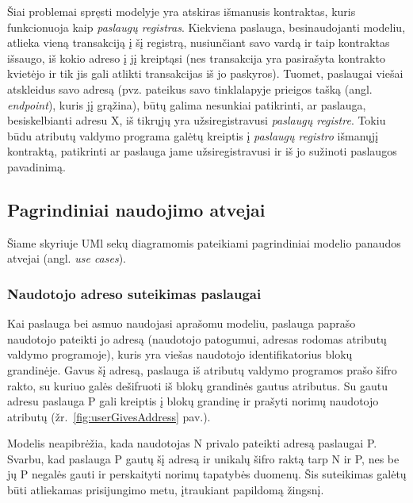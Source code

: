 Šiai problemai spręsti modelyje yra atskiras išmanusis kontraktas, kuris funkcionuoja kaip \textit{paslaugų registras}. Kiekviena
paslauga, besinaudojanti modeliu, atlieka vieną transakciją į šį registrą, nusiunčiant savo vardą ir taip kontraktas išsaugo, iš kokio adreso į jį kreiptąsi (nes
transakcija yra pasirašyta kontrakto kvietėjo ir tik jis gali atlikti transakcijas iš jo paskyros). Tuomet, paslaugai viešai
atskleidus savo adresą (pvz. pateikus savo tinklalapyje prieigos tašką (angl. \textit{endpoint}), kuris jį grąžina), būtų galima
nesunkiai patikrinti, ar paslauga, besiskelbianti adresu X, iš tikrųjų yra užsiregistravusi \textit{paslaugų registre}. Tokiu būdu
atributų valdymo programa galėtų kreiptis į \textit{paslaugų registro} išmanųjį kontraktą, patikrinti ar paslauga jame užsiregistravusi ir iš jo sužinoti paslaugos
pavadinimą. 

\subsection{Pagrindiniai naudojimo atvejai}

Šiame skyriuje UMl sekų diagramomis pateikiami pagrindiniai modelio panaudos atvejai (angl. \textit{use cases}).

\subsubsection{Naudotojo adreso suteikimas paslaugai}

Kai paslauga bei asmuo naudojasi aprašomu modeliu, paslauga paprašo naudotojo pateikti jo adresą (naudotojo patogumui, adresas rodomas
atributų valdymo programoje),
kuris yra viešas naudotojo identifikatorius blokų grandinėje.
Gavus šį adresą, paslauga iš atributų valdymo programos prašo šifro rakto, su kuriuo galės dešifruoti iš blokų grandinės gautus atributus.
Su gautu adresu paslauga P gali kreiptis į blokų grandinę ir prašyti norimų naudotojo atributų (žr.\hypertarget{fig:userGivesAddress}{~\ref{fig:userGivesAddress} pav.}).

Modelis neapibrėžia, kada naudotojas N privalo pateikti adresą paslaugai P. Svarbu, kad paslauga P gautų šį adresą ir unikalų šifro raktą tarp N ir P,
nes be jų P negalės gauti ir perskaityti norimų tapatybės duomenų. Šis suteikimas galėtų būti atliekamas prisijungimo metu, įtraukiant
papildomą žingsnį.

